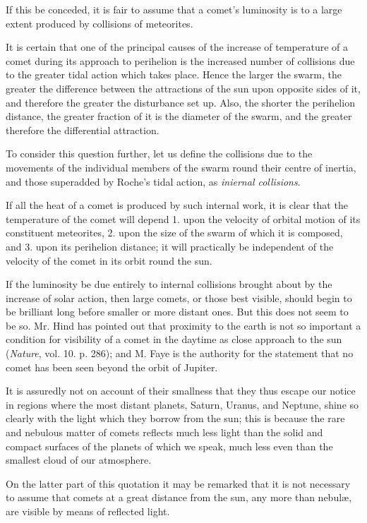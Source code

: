 \documentclass[a4paper, 12pt, oneside, polutonikogreek, english]{article}
\begin{document}
If this be conceded, it is fair to assume that a comet's luminosity is to a large extent produced by collisions of meteorites.

It is certain that one of the principal causes of the increase of temperature of a comet during its approach to perihelion is the increased number of collisions due to the greater tidal action which takes place. Hence the larger the swarm, the greater the difference between the attractions of the sun upon opposite sides of it, and therefore the greater the disturbance set up. Also, the shorter the perihelion distance, the greater fraction of it is the diameter of the swarm, and the greater therefore the differential attraction.

To consider this question further, let us define the collisions due to the movements of the individual members of the swarm round their centre of inertia, and those superadded by Roche's tidal action, as \emph{iniernal collisions}.

If all the heat of a comet is produced by such internal work, it is clear that the temperature of the comet will depend 1. upon the velocity of orbital motion of its constituent meteorites, 2. upon the size of the swarm of which it is composed, and 3. upon its perihelion distance; it will practically be independent of the velocity of the comet in its orbit round the sun.

If the luminosity be due entirely to internal collisions brought about by the increase of solar action, then large comets, or those best visible, should begin to be brilliant long before smaller or more distant ones. But this does not seem to be so. Mr. Hind has pointed out that proximity to the earth is not so important a condition for visibility of a comet in the daytime as close approach to the sun (\emph{Nature}, vol. 10. p. 286); and M. Faye is the authority for the statement that no comet has been seen beyond the orbit of Jupiter.

It is assuredly not on account of their smallness that they thus escape our notice in regions where the most distant planets, Saturn, Uranus, and Neptune, shine so clearly with the light which they borrow from the sun; this is because the rare and nebulous matter of comets reflects much less light than the solid and compact surfaces of the planets of which we speak, much less even than the smallest cloud of our atmosphere.

On the latter part of this quotation it may be remarked that it is not necessary to assume that comets at a great distance from the sun, any more than nebulæ, are visible by means of reflected light.
\end{document}

